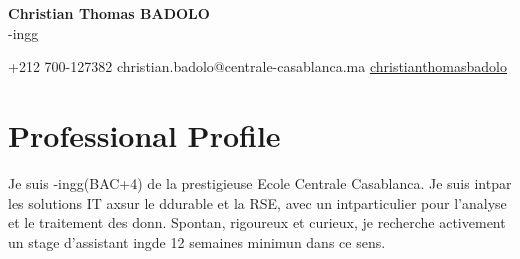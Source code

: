 \documentclass[a4paper,10pt]{article}
\begin{document}
\pagestyle{empty}

\begin{center}
    \textbf{\Huge Christian Thomas BADOLO} \\
    \vspace{2mm}
     \ufffdl\ufffdve-ing\ufffdnieur g\ufffdn\ufffdraliste
\end{center}

\vspace{4mm}
\begin{center}
     +212 700-127382 \hspace{2cm}
     christian.badolo@centrale-casablanca.ma \hspace{2cm}
     \href{https://www.linkedin.com/in/christianthomasbadolo/}{christianthomasbadolo}
\end{center}

\pagebreak

\section*{ Professional Profile}
Je suis \ufffdl\ufffdve-ing\ufffdnieur g\ufffdn\ufffdraliste (BAC+4) de la prestigieuse Ecole Centrale Casablanca. Je suis int\ufffdress\ufffd par les solutions IT ax\ufffdes sur le d\ufffdveloppement durable et la RSE, avec un int\ufffdr\ufffdt particulier pour l'analyse et le traitement des donn\ufffdes. Spontan\ufffd, rigoureux et curieux, je recherche activement un stage d'assistant ing\ufffdnieur de 12 semaines minimun dans ce sens.
\end{document}
